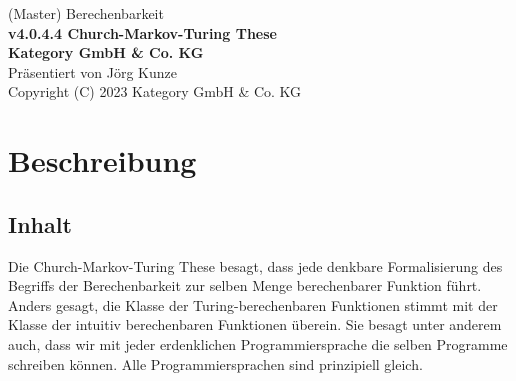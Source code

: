 \documentclass[a4paper]{amsart}
\theoremstyle{definition}
\begin{document}
\begin{titlepage}
\centering
{\huge
(Master) Berechenbarkeit\\[1cm]
\textbf{v4.0.4.4 Church-Markov-Turing These}
}\\[1cm]

\textbf{Kategory GmbH \& Co. KG}\\
Präsentiert von Jörg Kunze\\
Copyright (C) 2023 Kategory GmbH \& Co. KG

\end{titlepage}

%

\newpage

\section*{Beschreibung}

\subsection*{Inhalt}
Die Church-Markov-Turing These besagt, dass jede denkbare Formalisierung des Begriffs der Berechenbarkeit zur selben Menge berechenbarer Funktion führt. Anders gesagt, die Klasse der Turing-berechenbaren Funktionen stimmt mit der Klasse der intuitiv berechenbaren Funktionen überein. Sie besagt unter anderem auch, dass wir mit jeder erdenklichen Programmiersprache die selben Programme schreiben können. Alle Programmiersprachen sind prinzipiell gleich.
\end{document}

